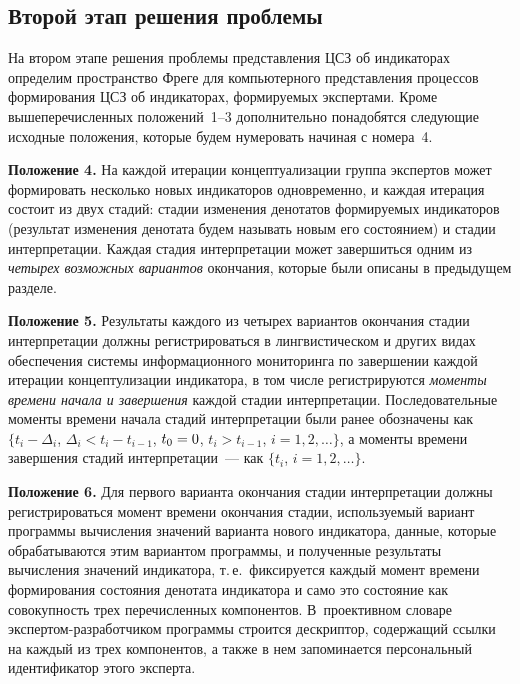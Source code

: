 \begin{multicols}{2}
   \subsection{Второй этап решения проблемы} %
   
   На втором этапе решения проблемы представления ЦСЗ об индикаторах определим 
пространство Фреге для компьютерного представления процессов формирования ЦСЗ об 
индикаторах, формируемых экспертами. Кроме вышеперечисленных положений~1--3 
дополнительно понадобятся следующие исходные положения, которые будем нумеровать 
начиная с номера~4.
   
   \textbf{Положение 4.} На каждой итерации концептуализации группа экспертов может 
формировать несколько новых индикаторов одновременно, и\linebreak
 каж\-дая итерация состоит из 
двух стадий: стадии изменения денотатов формируемых индикаторов (результат изменения 
денотата будем называть новым его состоянием) и стадии интерпретации. Каждая стадия 
интерпретации может завершиться одним из \textit{четырех возможных вариантов} 
окончания, которые были описаны в предыдущем разделе.
   
   \textbf{Положение 5.} Результаты каждого из четырех вариантов окончания стадии 
интерпретации должны регистрироваться в лингвистическом и других видах обеспечения 
системы информационного мониторинга по завершении каждой итерации концептулизации 
индикатора, в том числе регистрируются \textit{моменты времени начала и завершения} 
каждой стадии интерпретации. Последовательные моменты времени начала стадий 
интерпретации были ранее обозначены как $\{t_i -\Delta_i$, $\Delta_i < t_i - t_{i-1}$, 
$t_0\hm=0$, $t_i 
> t_{i-1}$, $i=1, 2, \ldots\}$, а моменты времени завершения стадий интерпретации~--- как 
$\{t_i$, $i = 1, 2, \ldots\}$.
   
   \textbf{Положение 6.} Для первого варианта окончания стадии интерпретации должны 
регистрироваться момент времени окончания стадии, используемый вариант программы 
вычисления значений варианта нового индикатора, данные, которые обрабатываются этим 
вариантом программы, и полученные результаты вычисления значений индикатора, т.\,е.\ 
фиксируется каждый момент времени формирования состояния денотата индикатора и само 
это состояние как совокупность трех перечисленных компонентов. В~проективном 
словаре экс\-пер\-том-разработчиком программы строится дескриптор, содержащий ссылки на 
каждый из трех компонентов, а также в нем запоминается персональный идентификатор 
этого эксперта.
   

\end{multicols}
